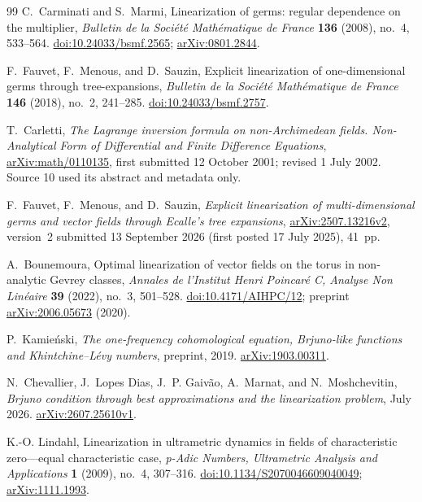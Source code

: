 \documentclass[11pt,letterpaper]{article}
\theoremstyle{definition}
\theoremstyle{remark}
\numberwithin{equation}{section}
\begin{document}
\begin{thebibliography}{99}
C.~Carminati and S.~Marmi,
Linearization of germs: regular dependence on the multiplier,
\emph{Bulletin de la Soci\'et\'e Math\'ematique de France} \textbf{136}
(2008), no.~4, 533--564.
\href{https://doi.org/10.24033/bsmf.2565}{doi:10.24033/bsmf.2565};
\href{https://arxiv.org/abs/0801.2844}{arXiv:0801.2844}.

F.~Fauvet, F.~Menous, and D.~Sauzin,
Explicit linearization of one-dimensional germs through tree-expansions,
\emph{Bulletin de la Soci\'et\'e Math\'ematique de France} \textbf{146}
(2018), no.~2, 241--285.
\href{https://doi.org/10.24033/bsmf.2757}{doi:10.24033/bsmf.2757}.

T.~Carletti,
\emph{The Lagrange inversion formula on non-Archimedean fields.
Non-Analytical Form of Differential and Finite Difference Equations},
\href{https://arxiv.org/abs/math/0110135}{arXiv:math/0110135}, first submitted
12 October 2001; revised 1 July 2002. Source 10 used its abstract and metadata only.

F.~Fauvet, F.~Menous, and D.~Sauzin,
\emph{Explicit linearization of multi-dimensional germs and vector fields
through Ecalle's tree expansions},
\href{https://arxiv.org/abs/2507.13216v2}{arXiv:2507.13216v2},
version~2 submitted 13 September 2026 (first posted 17 July 2025), 41~pp.

A.~Bounemoura,
Optimal linearization of vector fields on the torus in non-analytic
Gevrey classes,
\emph{Annales de l'Institut Henri Poincar\'e C, Analyse Non Lin\'eaire}
\textbf{39} (2022), no.~3, 501--528.
\href{https://doi.org/10.4171/AIHPC/12}{doi:10.4171/AIHPC/12};
preprint \href{https://arxiv.org/abs/2006.05673}{arXiv:2006.05673} (2020).

P.~Kamie\'nski,
\emph{The one-frequency cohomological equation, Brjuno-like functions and
Khintchine--L\'evy numbers}, preprint, 2019.
\href{https://arxiv.org/abs/1903.00311}{arXiv:1903.00311}.

N.~Chevallier, J.~Lopes Dias, J.~P. Gaiv\~ao, A.~Marnat, and
N.~Moshchevitin,
\emph{Brjuno condition through best approximations and the linearization
problem}, July 2026.
\href{https://arxiv.org/abs/2607.25610}{arXiv:2607.25610v1}.

K.-O. Lindahl,
Linearization in ultrametric dynamics in fields of characteristic
zero---equal characteristic case,
\emph{p-Adic Numbers, Ultrametric Analysis and Applications} \textbf{1}
(2009), no.~4, 307--316.
\href{https://doi.org/10.1134/S2070046609040049}{doi:10.1134/S2070046609040049};
\href{https://arxiv.org/abs/1111.1993}{arXiv:1111.1993}.


\end{thebibliography}
\end{document}
